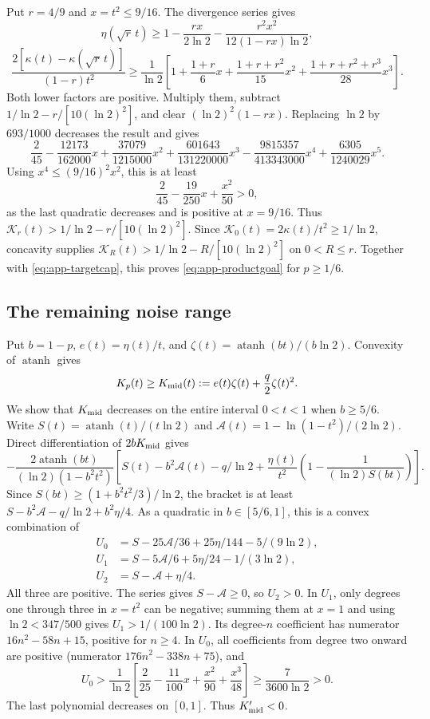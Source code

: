 Put $r=4/9$ and $x=t^2\le9/16$. The divergence series gives
\[
 \eta(\sqrt r\,t)\ge 1-\frac{rx}{2\ln2}-\frac{r^2x^2}{12(1-rx)\ln2},
\]
\[
 \frac{2[\kappa(t)-\kappa(\sqrt r\,t)]}{(1-r)t^2}
 \ge\frac1{\ln2}\left[1+\frac{1+r}{6}x+\frac{1+r+r^2}{15}x^2
       +\frac{1+r+r^2+r^3}{28}x^3\right].
\]
Both lower factors are positive. Multiply them, subtract $1/\ln2-r/[10(\ln2)^2]$, and clear
$(\ln2)^2(1-rx)$. Replacing $\ln2$ by $693/1000$ decreases the result and gives
\[
 \frac2{45}-\frac{12173}{162000}x+\frac{37079}{1215000}x^2
 +\frac{601643}{131220000}x^3-\frac{9815357}{413343000}x^4
 +\frac{6305}{1240029}x^5.
\]
Using $x^4\le(9/16)^2x^2$, this is at least
\[
 \frac2{45}-\frac{19}{250}x+\frac{x^2}{50}>0,
\]
as the last quadratic decreases and is positive at $x=9/16$. Thus $\mathcal
K_r(t)>1/\ln2-r/[10(\ln2)^2]$. Since $\mathcal K_0(t)=2\kappa(t)/t^2\ge1/\ln2$, concavity
supplies $\mathcal K_R(t)>1/\ln2-R/[10(\ln2)^2]$ on $0<R\le r$. Together with
\eqref{eq:app-targetcap}, this proves \eqref{eq:app-productgoal} for
$p\ge1/6$.

\subsection{The remaining noise range}
Put $b=1-p$, $e(t)=\eta(t)/t$, and $\zeta(t)=\operatorname{atanh}(bt)/(b\ln2)$.
Convexity of $\operatorname{atanh}$ gives
\begin{equation}\label{eq:app-midpoint}
 K_p(t)\ge K_{\rm mid}(t):=e(t)\zeta(t)+\frac q2\zeta(t)^2.
\end{equation}
We show that $K_{\rm mid}$ decreases on the entire interval $0<t<1$ when $b\ge5/6$.
Write $S(t)=\operatorname{atanh}(t)/(t\ln2)$ and $\mathcal A(t)=1-\ln(1-t^2)/(2\ln2)$.
Direct differentiation of $2bK_{\rm mid}$ gives
\[
 -\frac{2\operatorname{atanh}(bt)}{(\ln2)(1-b^2t^2)}
 \left[S(t)-b^2\mathcal A(t)-q/\ln2
 +\frac{\eta(t)}{t^2}\left(1-\frac1{(\ln2)S(bt)}\right)\right].
\]
Since $S(bt)\ge(1+b^2t^2/3)/\ln2$, the bracket is at least
$S-b^2\mathcal A-q/\ln2+b^2\eta/4$. As a quadratic in $b\in[5/6,1]$, this is a convex combination of
\begin{align*}
 U_0&=S-25\mathcal A/36+25\eta/144-5/(9\ln2),\\
 U_1&=S-5\mathcal A/6+5\eta/24-1/(3\ln2),\\
 U_2&=S-\mathcal A+\eta/4.
\end{align*}
All three are positive. The series gives $S-\mathcal A\ge0$, so $U_2>0$. In
$U_1$, only degrees one through three in $x=t^2$ can be negative; summing them
at $x=1$ and using $\ln2<347/500$ gives $U_1>1/(100\ln2)$. Its degree-$n$ coefficient
has numerator $16n^2-58n+15$, positive for $n\ge4$. In $U_0$, all coefficients
from degree two onward are positive (numerator $176n^2-338n+75$), and
\[
 U_0>\frac1{\ln2}\left[\frac2{25}-\frac{11}{100}x+\frac{x^2}{90}+\frac{x^3}{48}\right]
 \ge\frac7{3600\ln2}>0.
\]
The last polynomial decreases on $[0,1]$. Thus $K_{\rm mid}'<0$.


